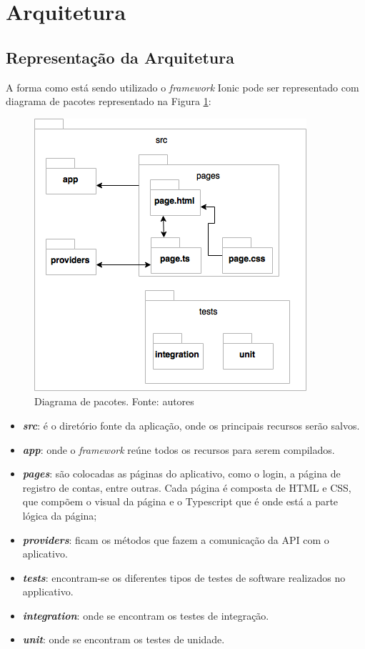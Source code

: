 \section{Arquitetura}

\subsection{Representação da Arquitetura}

A forma como está sendo utilizado o \textit{framework} Ionic pode ser representado com diagrama de pacotes representado na Figura \ref{img:pacotes}:

\begin{figure}[H]
    \centering
    \includegraphics[scale=0.5]{figuras/ionic_arch.png}
    \caption[Diagrama de pacotes do aplicativo]{Diagrama de pacotes. Fonte: autores}
    \label{img:pacotes}
\end{figure}
\pagebreak

\begin{itemize}
\item\textbf{\textit{src}}: é o diretório fonte da aplicação, onde os principais recursos serão salvos.
\item\textbf{\textit{app}}: onde o \textit{framework} reúne todos os recursos para serem compilados.
\item\textbf{\textit{pages}}: são colocadas as páginas do aplicativo, como o login, a página de registro de contas, entre outras. Cada página é composta de HTML e CSS, que compõem o visual da página e o Typescript que é onde está a parte lógica da página;
\item\textbf{\textit{providers}}: ficam os métodos que fazem a comunicação da API com o aplicativo.
\item\textbf{\textit{tests}}: encontram-se os diferentes tipos de testes de software realizados no applicativo.
\item\textbf{\textit{integration}}: onde se encontram os testes de integração.
\item\textbf{\textit{unit}}: onde se encontram os testes de unidade.
\end{itemize}

